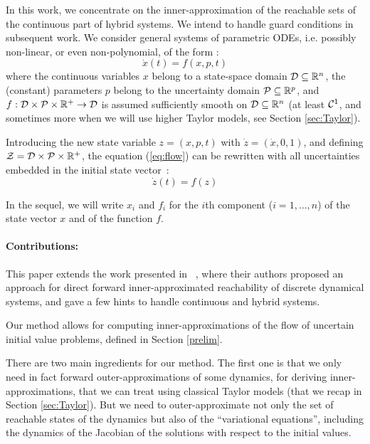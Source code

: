 \documentclass{sig-alternate-05-2015} %
\newcommand\ForAuthors[1]%
 {\par\smallskip                     %
  \begin{center}%
   \fbox%
   {\parbox{0.9\linewidth}%
    {\raggedright\sc--- #1}%
   }%
  \end{center}%
  \par\smallskip                     %
 }
\def\R{{\mathbb R}}
\begin{document}
In this work, we concentrate on the inner-approximation of the reachable sets of
the continuous part of hybrid systems. We intend to handle guard conditions in subsequent work.
We consider general systems of parametric ODEs, i.e. possibly non-linear, or
even non-polyno\-mial, of the form : 
\begin{equation}
\dot{x}(t) = f(x,p,t)
\label{eq:flow}
\end{equation}
\noindent where the continuous variables $x$ belong to a state-space domain 
${\cal D} \subseteq \R^n$, the (constant) parameters $p$ belong to the uncertainty domain
${\cal P} \subseteq \R^p$, and 
$f: {\cal D} \times {\cal P} \times \R^+ \rightarrow {\cal D}$ is assumed sufficiently smooth 
on ${\cal D} \subseteq \R^n$ (at least ${\cal C}^1$, and sometimes more when we will use higher
Taylor models, see Section \ref{sec:Taylor}).

Introducing the new state variable $z=(x,p,t)$ with $\dot z = (\dot x,0,1)$, and defining ${\cal Z} = {\cal D} \times {\cal P} \times \R^+$,
the equation (\ref{eq:flow}) can be rewritten with all uncertainties embedded in the initial state vector~:
\begin{equation} \dot z(t) = f(z)
\label{eq:flowb}
\end{equation}

In the sequel, we will write $x_i$ and $f_i$ for the $i$th component ($i=1,\ldots,n$) of
the state vector $x$ and of the function $f$. 

\paragraph{Contributions:}

This paper extends the work presented in ~\cite{sas07,hscc14}, where their authors proposed an approach for direct forward inner-approximated reachability of 
discrete dynamical systems, and gave a few hints to handle continuous and hybrid systems. 

Our method allows for 
computing inner-approximations of the flow of uncertain initial value problems, defined
in Section \ref{prelim}. 

There are two main ingredients for our method. The first one is that we only need in fact forward 
outer-approxima\-tions of some dynamics, for deriving inner-approximations, that we can treat using classical
Taylor models (that we recap in Section \ref{sec:Taylor}). But we need to outer-approximate not only 
the set of reachable states of the dynamics but also
of the ``variational equations'', including the dynamics of the Jacobian of the solutions with respect to the
initial values. 
\end{document}
